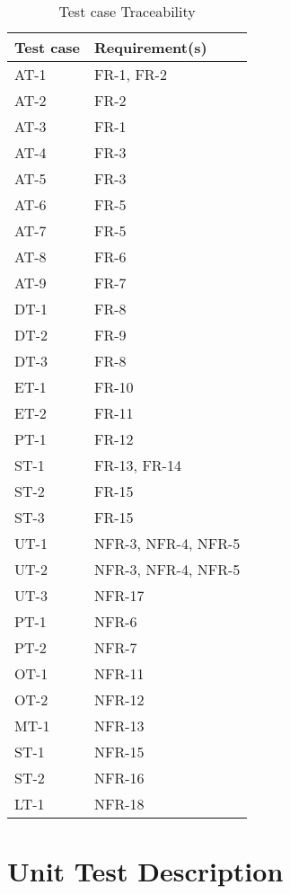 \documentclass[12pt, titlepage]{article}
\begin{document}
\begin{table}[H]
  \caption{Test case Traceability}
  \begin{tabular}{|p{7cm}|p{7cm}|}
  \hline
  Test case & Requirement(s)\\
  \hline
  AT-1 & FR-1, FR-2\\
  \hline
  AT-2 & FR-2\\
  \hline
  AT-3 & FR-1\\
  \hline
  AT-4 & FR-3\\
  \hline
  AT-5 & FR-3\\
  \hline
  AT-6 & FR-5\\
  \hline
  AT-7 & FR-5\\
  \hline
  AT-8 & FR-6\\
  \hline
  AT-9 & FR-7\\
  \hline
  DT-1 & FR-8\\
  \hline
  DT-2 & FR-9\\
  \hline
  DT-3 & FR-8\\
  \hline
  ET-1 & FR-10\\
  \hline
  ET-2 & FR-11\\
  \hline
  PT-1 & FR-12\\
  \hline
  ST-1 & FR-13, FR-14\\
  \hline
  ST-2 & FR-15\\
  \hline
  ST-3 & FR-15\\
  \hline
  UT-1 & NFR-3, NFR-4, NFR-5\\
  \hline
  UT-2 & NFR-3, NFR-4, NFR-5\\
  \hline
  UT-3 & NFR-17\\
  \hline
  PT-1 & NFR-6\\
  \hline
  PT-2 & NFR-7\\
  \hline
  OT-1 & NFR-11\\
  \hline
  OT-2 & NFR-12\\
  \hline
 MT-1 & NFR-13\\
  \hline
 ST-1 & NFR-15\\
  \hline
 ST-2 & NFR-16\\
 LT-1 & NFR-18\\
  \hline
  \end{tabular}
\end{table}

\section{Unit Test Description}

\end{document}
